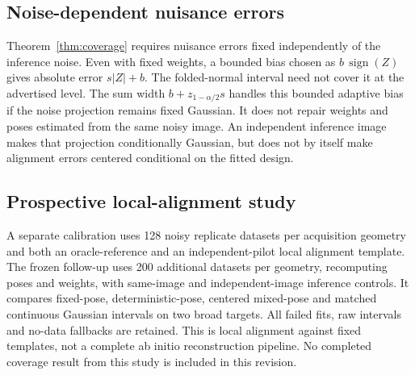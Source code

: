 \subsection{Noise-dependent nuisance errors}
Theorem~\ref{thm:coverage} requires nuisance errors fixed independently of the
inference noise. Even with fixed weights, a bounded bias chosen as
$b\,\operatorname{sign}(Z)$ gives absolute error $s|Z|+b$.
The folded-normal interval need not cover it at the advertised level.
The sum width $b+z_{1-\alpha/2}s$ handles this bounded adaptive bias if the
noise projection remains fixed Gaussian. It does not repair weights and
poses estimated from the same noisy image. An independent inference image
makes that projection conditionally Gaussian, but does not by itself make
alignment errors centered conditional on the fitted design.

\subsection{Prospective local-alignment study}
A separate calibration uses 128 noisy replicate datasets per acquisition
geometry and both an oracle-reference and an independent-pilot local alignment
template. The frozen follow-up uses 200 additional datasets per geometry,
recomputing poses and weights, with same-image and independent-image inference
controls. It compares fixed-pose, deterministic-pose, centered mixed-pose and
matched continuous Gaussian intervals on two broad targets. All failed fits,
raw intervals and no-data fallbacks are retained. This is local alignment
against fixed templates, not a complete ab initio reconstruction pipeline.
No completed coverage result from this study is included in this revision.
